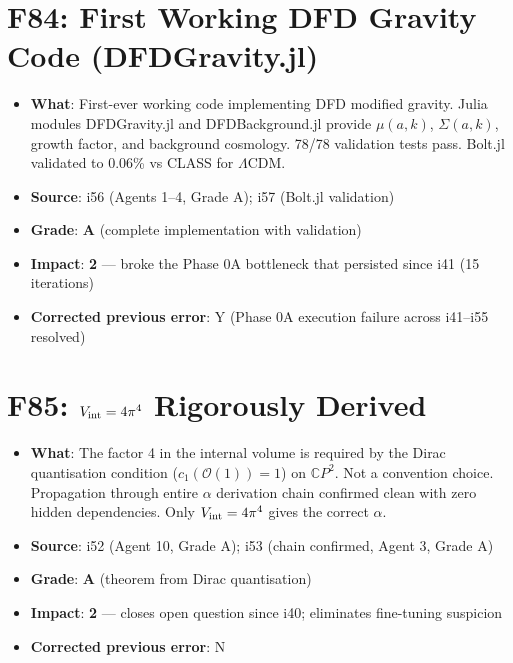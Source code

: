 \documentclass[11pt,a4paper]{article}
\newcommand{\grade}[1]{\textbf{#1}}
\newcommand{\impact}[1]{\textbf{#1}}
\begin{document}
\section{F84: First Working DFD Gravity Code (DFDGravity.jl)}
\begin{itemize}[nosep]
\item \textbf{What}: First-ever working code implementing DFD modified gravity. Julia modules DFDGravity.jl and DFDBackground.jl provide $\mu(a,k)$, $\Sigma(a,k)$, growth factor, and background cosmology. 78/78 validation tests pass. Bolt.jl validated to 0.06\% vs CLASS for $\Lambda$CDM.
\item \textbf{Source}: i56 (Agents 1--4, Grade A); i57 (Bolt.jl validation)
\item \textbf{Grade}: \grade{A} (complete implementation with validation)
\item \textbf{Impact}: \impact{2} --- broke the Phase 0A bottleneck that persisted since i41 (15 iterations)
\item \textbf{Corrected previous error}: Y (Phase 0A execution failure across i41--i55 resolved)
\end{itemize}

\section{F85: $V_{\rm int} = 4\pi^4$ Rigorously Derived}
\begin{itemize}[nosep]
\item \textbf{What}: The factor 4 in the internal volume is required by the Dirac quantisation condition ($c_1(\mathcal{O}(1)) = 1$) on $\mathbb{C}P^2$. Not a convention choice. Propagation through entire $\alpha$ derivation chain confirmed clean with zero hidden dependencies. Only $V_{\rm int} = 4\pi^4$ gives the correct $\alpha$.
\item \textbf{Source}: i52 (Agent 10, Grade A); i53 (chain confirmed, Agent 3, Grade A)
\item \textbf{Grade}: \grade{A} (theorem from Dirac quantisation)
\item \textbf{Impact}: \impact{2} --- closes open question since i40; eliminates fine-tuning suspicion
\item \textbf{Corrected previous error}: N
\end{itemize}
\end{document}
